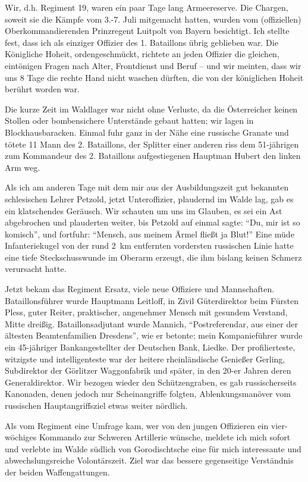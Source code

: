 Wir, d.h. Regiment 19, waren ein paar Tage lang Armeereserve. Die Chargen, soweit sie die Kämpfe vom 3.-7. Juli mitgemacht hatten, wurden vom (offiziellen) Oberkommandierenden Prinzregent Luitpolt von Bayern besichtigt. Ich stellte fest, dass ich als einziger Offizier des 1. Bataillons übrig geblieben war. Die Königliche Hoheit, ordengeschmückt, richtete an jeden Offizier die gleichen, eintönigen Fragen nach Alter, Frontdienst und Beruf -- und wir meinten, dass wir uns 8 Tage die rechte Hand nicht waschen dürften, die von der königlichen Hoheit berührt worden war.

Die kurze Zeit im Waldlager war nicht ohne Verluste, da die Österreicher keinen Stollen oder bombensichere Unterstände gebaut hatten; wir lagen in Blockhausbaracken. Einmal fuhr ganz in der Nähe eine russische Granate und tötete 11 Mann des 2. Bataillons, der Splitter einer anderen riss dem 51-jährigen zum Kommandeur des 2. Bataillons aufgestiegenen Hauptman Hubert den linken Arm weg.

Als ich am anderen Tage mit dem mir aus der Ausbildungszeit gut bekannten schlesischen Lehrer Petzold, jetzt Unteroffizier, plaudernd im Walde lag, gab es ein klatschendes Geräusch. Wir schauten um uns im Glauben, es sei ein Ast abgebrochen und plauderten weiter, bis Petzold auf einmal sagte: \enquote{Du, mir ist so komisch}, und fortfuhr: \enquote{Mensch, aus meinem Ärmel fließt ja Blut!} Eine müde Infanteriekugel von der rund 2~km entfernten vordersten russischen Linie hatte eine tiefe Steckschusswunde im Oberarm erzeugt, die ihm bislang keinen Schmerz verursacht hatte.

Jetzt bekam das Regiment Ersatz, viele neue Offiziere und Mannschaften. Bataillonsführer wurde Hauptmann Leitloff, in Zivil Güterdirektor beim Fürsten Pless, guter Reiter, praktischer, angenehmer Mensch mit gesundem Verstand, Mitte dreißig. Bataillonsadjutant wurde Mannich, \enquote{Postreferendar, aus einer der ältesten Beamtenfamilien Dresdens}, wie er betonte; mein Kompanieführer wurde ein 45-jähriger Bankangestellter der Deutschen Bank, Liedke. Der profilierteste, witzigste und intelligenteste war der heitere rheinländische Genießer Gerling, Subdirektor der Görlitzer Waggonfabrik und später, in den 20-er Jahren deren Generaldirektor. Wir bezogen wieder den Schützengraben, es gab russischerseits Kanonaden, denen jedoch nur Scheinangriffe folgten, Ablenkungsmanöver vom russischen Hauptangriffsziel etwas weiter nördlich.

Als vom Regiment eine Umfrage kam, wer von den jungen Offizieren ein vier-wöchiges Kommando zur Schweren Artillerie wünsche, meldete ich mich sofort und verlebte im Walde südlich von Gorodischtsche eine für mich interessante und abwechslungsreiche Volontärszeit. Ziel war das bessere gegenseitige Verständnis der beiden Waffengattungen.

